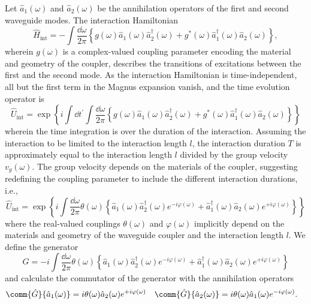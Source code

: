 Let $\hat{a}_1(\omega)$ and $\hat{a}_2(\omega)$ be the annihilation operators of the first and second waveguide modes.
The interaction Hamiltonian
\begin{equation}
	\hat{H}_\text{int}
	=
	-
	\int\frac{\dd{\omega}}{2\pi}
	\left\{
		g(\omega)
		\hat{a}_1(\omega)
		\hat{a}_2^\dagger(\omega)
		+
		g^*(\omega)
		\hat{a}_1^\dagger(\omega)
		\hat{a}_2(\omega)
	\right\}
	,
\end{equation}
wherein $g(\omega)$ is a complex-valued coupling parameter encoding the material and geometry of the coupler, describes the transitions of excitations between the first and the second mode.
As the interaction Hamiltonian is time-independent, all but the first term in the Magnus expansion vanish, and the time evolution operator is
\begin{equation}
	\hat{U}_\text{int}
	=
	\exp\left\{
		i
		\int\dd{t^\prime}
		\int\frac{\dd{\omega}}{2\pi}
		\left\{
			g(\omega)
			\hat{a}_1(\omega)
			\hat{a}_2^\dagger(\omega)
			+
			g^*(\omega)
			\hat{a}_1^\dagger(\omega)
			\hat{a}_2(\omega)
		\right\}
	\right\}
\end{equation}
wherein the time integration is over the duration of the interaction.
Assuming the interaction to be limited to the interaction length $l$, the interaction duration $T$ is approximately equal to the interaction length $l$ divided by the group velocity $v_g(\omega)$.
The group velocity depends on the materials of the coupler, suggesting redefining the coupling parameter to include the different interaction durations, i.e.,
\begin{equation}
	\hat{U}_\text{int}
	=
	\exp\left\{
		i
		\int\frac{\dd{\omega}}{2\pi}
		\theta(\omega)
		\left\{
			\hat{a}_1(\omega)
			\hat{a}_2^\dagger(\omega)
			e^{-i\varphi(\omega)}
			+
			\hat{a}_1^\dagger(\omega)
			\hat{a}_2(\omega)
			e^{+i\varphi(\omega)}
		\right\}
	\right\}
\end{equation}
where the real-valued couplings $\theta(\omega)$ and $\varphi(\omega)$ implicitly depend on the materials and geometry of the waveguide coupler and the interaction length $l$.
We define the generator
\begin{equation}
	\hat{G}
	=
	-i
	\int\frac{\dd{\omega}}{2\pi}
	\theta(\omega)
	\left\{
		\hat{a}_1(\omega)
		\hat{a}_2^\dagger(\omega)
		e^{-i\varphi(\omega)}
		+
		\hat{a}_1^\dagger(\omega)
		\hat{a}_2(\omega)
		e^{+i\varphi(\omega)}
	\right\}
\end{equation}
and calculate the commutator of the generator with the annihilation operators
\begin{align}
	\comm{\hat{G}}{\hat{a}_1(\omega)}
	&=
	i
	\theta(\omega)
	\hat{a}_2(\omega)
	e^{+i\varphi(\omega)}
	&
	\comm{\hat{G}}{\hat{a}_2(\omega)}
	&=
	i
	\theta(\omega)
	\hat{a}_1(\omega)
	e^{-i\varphi(\omega)}
	.
\end{align}
